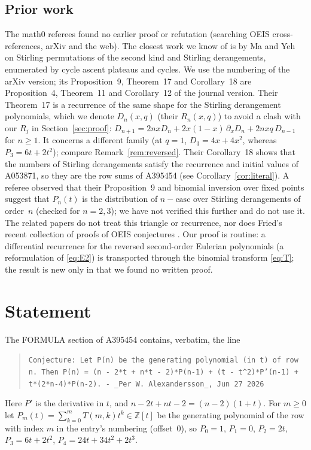 \documentclass[11pt]{amsart}
\theoremstyle{plain}
\theoremstyle{definition}
\newcommand{\Z}{\mathbb{Z}}
\begin{document}
\subsection*{Prior work}
The math0 referees found no earlier proof or refutation (searching OEIS cross-references, arXiv and the web). The closest work we know of is by Ma and Yeh \cite{MY} on Stirling permutations of the second kind and Stirling derangements, enumerated by cycle ascent plateaus and cycles. We use the numbering of the arXiv version; its Proposition~9, Theorem~17 and Corollary~18 are Proposition~4, Theorem~11 and Corollary~12 of the journal version. Their Theorem~17 is a recurrence of the same shape for the Stirling derangement polynomials, which we denote $D_n(x,q)$ (their $R_n(x,q)$) to avoid a clash with our $R_j$ in Section~\ref{sec:proof}:
$D_{n+1}=2nxD_n+2x(1-x)\,\partial_xD_n+2nxq\,D_{n-1}$ for $n\ge1$. It concerns a different family (at $q=1$, $D_3=4x+4x^2$, whereas $P_3=6t+2t^2$); compare Remark~\ref{rem:reversed}. Their Corollary~18 shows that the numbers of Stirling derangements satisfy the recurrence and initial values of A053871, so they are the row sums of A395454 (see Corollary~\ref{cor:literal}). A referee observed that their Proposition~9 and binomial inversion over fixed points suggest that $P_n(t)$ is the distribution of $n-\mathrm{casc}$ over Stirling derangements of order~$n$ (checked for $n=2,3$); we have not verified this further and do not use it.
The related papers \cite{DLMY,MKYY} do not treat this triangle or recurrence, nor does Fried's recent collection of proofs of OEIS conjectures \cite{Fried}.
Our proof is routine: a differential recurrence for the reversed second-order Eulerian polynomials (a reformulation of \eqref{eq:E2}) is transported through the binomial transform \eqref{eq:T}; the result is new only in that we found no written proof.

\section{Statement}\label{sec:statement}

The FORMULA section of A395454 \cite{A395454} contains, verbatim, the line
\begin{quote}
{\small\raggedright\texttt{Conjecture: Let P(n) be the generating polynomial (in t) of row n. Then P(n) = (n - 2*t + n*t - 2)*P(n-1) + (t - t\^{}2)*P'(n-1) + t*(2*n-4)*P(n-2). - \_Per W. Alexandersson\_, Jun 27 2026}\par}
\end{quote}
Here $P'$ is the derivative in $t$, and $n-2t+nt-2=(n-2)(1+t)$.
For $m\ge0$ let $P_m(t)=\sum_{k=0}^{m}T(m,k)t^k\in\Z[t]$ be the generating polynomial of the row with index $m$ in the entry's numbering (offset~$0$), so $P_0=1$, $P_1=0$, $P_2=2t$, $P_3=6t+2t^2$, $P_4=24t+34t^2+2t^3$.
\end{document}
